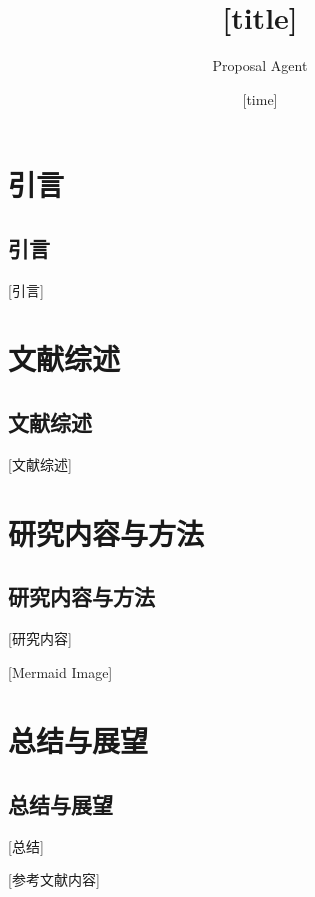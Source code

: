\documentclass{phdproposal}
\title{[title]}
\author{Proposal Agent}
\date{[time]}
\begin{document}
\frontmatter

\maketitle

\clearpage
{}

\maketoc[nopagenum]

\clearpage
{}

\mainmatter


\chapter{引言}
\section{引言}

[引言]

\chapter{文献综述}
\section{文献综述}

[文献综述]

\chapter{研究内容与方法}
\section{研究内容与方法}

[研究内容]


[Mermaid Image]


\chapter{总结与展望}
\section{总结与展望}

[总结]




\backmatter


[参考文献内容]
% 
% 
\end{document}
